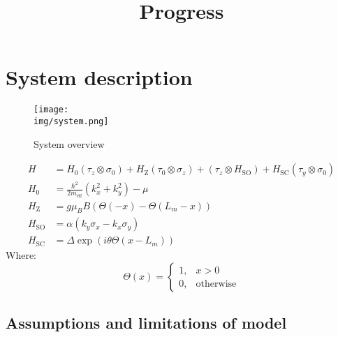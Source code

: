 \documentclass[10pt,a4paper]{article}
\newcommand{\kx}{k_x}
\newcommand{\ky}{k_y}
\newcommand{\meff}{m_\text{eff}}
\newcommand{\img}{./images}
\begin{document}
\title{Progress}
\maketitle
\section{System description}
	\begin{figure}[H]
		\texttt{[image: \\img/system.png]}
		\caption{System overview}
	\end{figure}
	
	\begin{align}
		H &= H_0(\tau_z \otimes \sigma_0) + 
		H_\text{Z} (\tau_0 \otimes \sigma_z) +
		(\tau_z \otimes H_\text{SO}) +
	 H_\text{SC}(\tau_y \otimes \sigma_0) \\
		H_0 &= \frac{\hbar^2}{2\meff}\left(\kx^2 + \ky^2\right) - \mu \\
		H_\text{Z} &= g \mu_B B  \left(\Theta(-x) - \Theta(L_m-x)\right)  \\
		H_\text{SO} &= \alpha \left( \ky \sigma_x - \kx \sigma_y \right)\\
		H_\text{SC} &= \Delta \exp \left(i \theta \Theta(x-L_m) \right)
	\end{align}
	Where: 
	\begin{equation}
	\Theta(x) = 
	\begin{cases}
	1,& x>0\\
	0,& \text{otherwise}
	\end{cases}
	\end{equation}
	\subsection{Assumptions and limitations of model}
\end{document}
